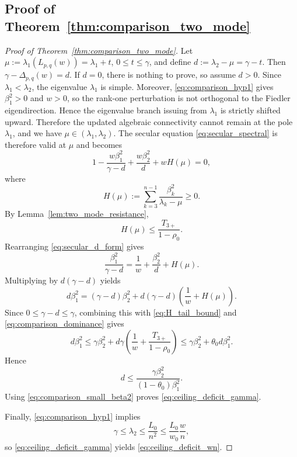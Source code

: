 \documentclass[11pt]{article}
\numberwithin{equation}{section}
\theoremstyle{definition}
\theoremstyle{remark}
\begin{document}
\subsection{Proof of Theorem~\ref{thm:comparison_two_mode}}
\begin{proof}[Proof of Theorem~\ref{thm:comparison_two_mode}]
	Let $\mu:=\lambda_1(L_{p,q}(w))=\lambda_1+t$, $0\le t\le \gamma$,
	and define $d:=\lambda_2-\mu=\gamma-t$.
	Then $\gamma-\Delta_{p,q}(w)=d$. If $d=0$, there is nothing to prove,
	so assume $d>0$. Since $\lambda_1<\lambda_2$, the eigenvalue
	$\lambda_1$ is simple. Moreover, \eqref{eq:comparison_hyp1} gives
	$\beta_1^2>0$ and $w>0$, so the rank-one perturbation is not orthogonal
	to the Fiedler eigendirection. Hence the eigenvalue branch issuing from
	$\lambda_1$ is strictly shifted upward. Therefore the updated algebraic
	connectivity cannot remain at the pole $\lambda_1$, and we have
	$\mu\in(\lambda_1,\lambda_2)$. The secular equation
	\eqref{eq:secular_spectral} is therefore valid at $\mu$ and becomes
	\begin{equation}\label{eq:secular_d_form}
		1-\frac{w\beta_1^2}{\gamma-d}+\frac{w\beta_2^2}{d}+wH(\mu)=0,
	\end{equation}
	where
	\[
	H(\mu):=\sum_{k=3}^{n-1}\frac{\beta_k^2}{\lambda_k-\mu}\ge 0.
	\]
	By Lemma~\ref{lem:two_mode_resistance},
	\begin{equation}\label{eq:H_tail_bound}
		H(\mu)\le \frac{T_{3+}}{1-\rho_0}.
	\end{equation}
	Rearranging \eqref{eq:secular_d_form} gives
	\begin{equation}\label{eq:secular_rearranged}
		\frac{\beta_1^2}{\gamma-d}
		=
		\frac1w+\frac{\beta_2^2}{d}+H(\mu).
	\end{equation}
	Multiplying by $d(\gamma-d)$ yields
	\[
	d\beta_1^2
	=
	(\gamma-d)\beta_2^2
	+
	d(\gamma-d)\left(\frac1w+H(\mu)\right).
	\]
	Since $0\le \gamma-d\le \gamma$, combining this with
	\eqref{eq:H_tail_bound} and \eqref{eq:comparison_dominance} gives
	\[
	d\beta_1^2
	\le
	\gamma\beta_2^2
	+
	d\gamma\left(\frac1w+\frac{T_{3+}}{1-\rho_0}\right)
	\le
	\gamma\beta_2^2+\theta_0 d\beta_1^2.
	\]
	Hence
	\[
	d\le \frac{\gamma\beta_2^2}{(1-\theta_0)\beta_1^2}.
	\]
	Using \eqref{eq:comparison_small_beta2} proves
	\eqref{eq:ceiling_deficit_gamma}.
	
	Finally, \eqref{eq:comparison_hyp1} implies
	\[
	\gamma\le \lambda_2\le \frac{L_0}{n^2}
	\le \frac{L_0}{w_0}\frac{w}{n},
	\]
	so \eqref{eq:ceiling_deficit_gamma} yields
	\eqref{eq:ceiling_deficit_wn}.
\end{proof}
\end{document}
